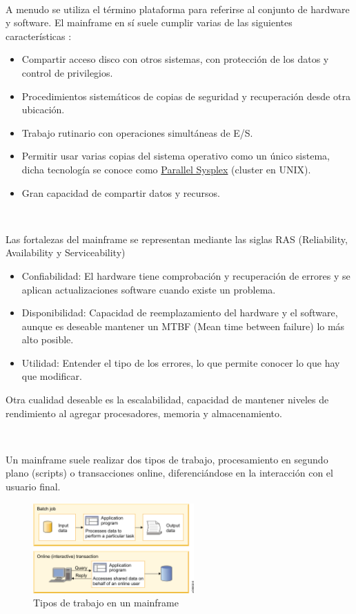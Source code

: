 \documentclass[paper=a4, fontsize=10pt]{scrartcl} %
\numberwithin{equation}{section} %
\numberwithin{figure}{section} %
\numberwithin{table}{section} %
\begin{document}
\

A menudo se utiliza el término plataforma para referirse al conjunto de hardware y software. El mainframe en sí suele cumplir varias de las siguientes características \cite{ibm-mainframes}:
\begin{itemize}
	\item Compartir acceso disco con otros sistemas, con protección de los datos y control de privilegios.
	\item Procedimientos sistemáticos de copias de seguridad y recuperación desde otra ubicación.
	\item Trabajo rutinario con operaciones simultáneas de E/S. %
	\item Permitir usar varias copias del sistema operativo como un único sistema, dicha tecnología se conoce como \href{https://www-03.ibm.com/systems/z/advantages/pso/}{Parallel Sysplex} (cluster en UNIX).
	\item Gran capacidad de compartir datos y recursos.
\end{itemize}

\

Las fortalezas del mainframe se representan mediante las siglas RAS (Reliability, Availability y Serviceability)
\begin{itemize}
	\item Confiabilidad: El hardware tiene comprobación y recuperación de errores y se aplican actualizaciones software cuando existe un problema. 
	\item Disponibilidad: Capacidad de reemplazamiento del hardware y el software, aunque es deseable mantener un MTBF (Mean time between failure) lo más alto posible.
	\item Utilidad: Entender el tipo de los errores, lo que permite conocer lo que hay que modificar.
\end{itemize}
Otra cualidad deseable es la escalabilidad, capacidad de mantener niveles de rendimiento al agregar procesadores, memoria y almacenamiento.

\

Un mainframe suele realizar dos tipos de trabajo, procesamiento en segundo plano (scripts) o transacciones online, diferenciándose en la interacción con el usuario final.

\begin{figure}[H]
	\centering
	\label{workloads}
	\includegraphics[trim = 0mm 0mm 5mm 0mm, clip, width=0.55\textwidth]{./Imagenes/workloads.png}
	\caption{Tipos de trabajo en un mainframe \cite{ibm-mainframes}}
\end{figure}
\end{document}
